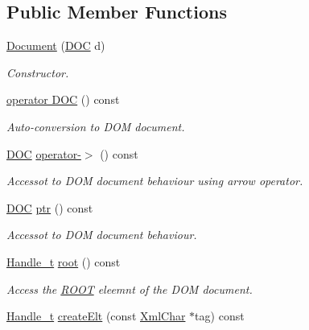 \subsection*{Public Member Functions}
\begin{DoxyCompactItemize}
\item 
\hyperlink{class_d_d4hep_1_1_x_m_l_1_1_document_a3f4274cfb546e8b61f6a1de9e6f43a4e}{Document} (\hyperlink{class_d_d4hep_1_1_x_m_l_1_1_document_a685ff83de83e9b7b37e79ad846fc2387}{D\+OC} d)
\begin{DoxyCompactList}\small\item\em Constructor. \end{DoxyCompactList}\item 
\hyperlink{class_d_d4hep_1_1_x_m_l_1_1_document_ae1d75c03ff7d6a023f7d4b31f76dd8ab}{operator D\+OC} () const
\begin{DoxyCompactList}\small\item\em Auto-\/conversion to D\+OM document. \end{DoxyCompactList}\item 
\hyperlink{class_d_d4hep_1_1_x_m_l_1_1_document_a685ff83de83e9b7b37e79ad846fc2387}{D\+OC} \hyperlink{class_d_d4hep_1_1_x_m_l_1_1_document_a20800bb9f49130d545fb32c7cee7f011}{operator-\/$>$} () const
\begin{DoxyCompactList}\small\item\em Accessot to D\+OM document behaviour using arrow operator. \end{DoxyCompactList}\item 
\hyperlink{class_d_d4hep_1_1_x_m_l_1_1_document_a685ff83de83e9b7b37e79ad846fc2387}{D\+OC} \hyperlink{class_d_d4hep_1_1_x_m_l_1_1_document_a2673a02ca3e0e960766103c1714f1de9}{ptr} () const
\begin{DoxyCompactList}\small\item\em Accessot to D\+OM document behaviour. \end{DoxyCompactList}\item 
\hyperlink{class_d_d4hep_1_1_x_m_l_1_1_handle__t}{Handle\+\_\+t} \hyperlink{class_d_d4hep_1_1_x_m_l_1_1_document_a27c53d4bc74da0b3a185dc3e3d16a36c}{root} () const
\begin{DoxyCompactList}\small\item\em Access the \hyperlink{namespace_r_o_o_t}{R\+O\+OT} eleemnt of the D\+OM document. \end{DoxyCompactList}\item 
\hyperlink{class_d_d4hep_1_1_x_m_l_1_1_handle__t}{Handle\+\_\+t} \hyperlink{class_d_d4hep_1_1_x_m_l_1_1_document_a9d178bf5ff49794334d416d98e09ffc1}{create\+Elt} (const \hyperlink{namespace_d_d4hep_1_1_x_m_l_a09e5d9cc86ed782f6826dfe0778c1815}{Xml\+Char} $\ast$tag) const

\end{DoxyCompactItemize}
